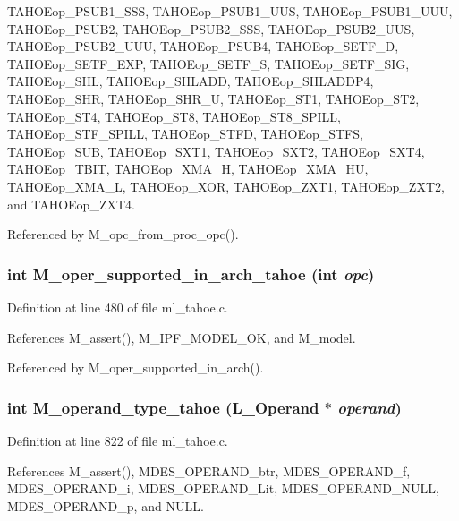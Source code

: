 TAHOEop\_\-PSUB1\_\-SSS, TAHOEop\_\-PSUB1\_\-UUS, TAHOEop\_\-PSUB1\_\-UUU, TAHOEop\_\-PSUB2, TAHOEop\_\-PSUB2\_\-SSS, TAHOEop\_\-PSUB2\_\-UUS, TAHOEop\_\-PSUB2\_\-UUU, TAHOEop\_\-PSUB4, TAHOEop\_\-SETF\_\-D, TAHOEop\_\-SETF\_\-EXP, TAHOEop\_\-SETF\_\-S, TAHOEop\_\-SETF\_\-SIG, TAHOEop\_\-SHL, TAHOEop\_\-SHLADD, TAHOEop\_\-SHLADDP4, TAHOEop\_\-SHR, TAHOEop\_\-SHR\_\-U, TAHOEop\_\-ST1, TAHOEop\_\-ST2, TAHOEop\_\-ST4, TAHOEop\_\-ST8, TAHOEop\_\-ST8\_\-SPILL, TAHOEop\_\-STF\_\-SPILL, TAHOEop\_\-STFD, TAHOEop\_\-STFS, TAHOEop\_\-SUB, TAHOEop\_\-SXT1, TAHOEop\_\-SXT2, TAHOEop\_\-SXT4, TAHOEop\_\-TBIT, TAHOEop\_\-XMA\_\-H, TAHOEop\_\-XMA\_\-HU, TAHOEop\_\-XMA\_\-L, TAHOEop\_\-XOR, TAHOEop\_\-ZXT1, TAHOEop\_\-ZXT2, and TAHOEop\_\-ZXT4.

Referenced by M\_\-opc\_\-from\_\-proc\_\-opc().
\subsubsection{\setlength{\rightskip}{0pt plus 5cm}int M\_\-oper\_\-supported\_\-in\_\-arch\_\-tahoe (int {\em opc})}\label{m__tahoe_8h_3dc904fa2e7528b127b4eb1cd19c004f}




Definition at line 480 of file ml\_\-tahoe.c.

References M\_\-assert(), M\_\-IPF\_\-MODEL\_\-OK, and M\_\-model.

Referenced by M\_\-oper\_\-supported\_\-in\_\-arch().
\subsubsection{\setlength{\rightskip}{0pt plus 5cm}int M\_\-operand\_\-type\_\-tahoe (L\_\-Operand $\ast$ {\em operand})}\label{m__tahoe_8h_e996d5f4bafca5d9e3a7f7e2abbdea57}




Definition at line 822 of file ml\_\-tahoe.c.

References M\_\-assert(), MDES\_\-OPERAND\_\-btr, MDES\_\-OPERAND\_\-f, MDES\_\-OPERAND\_\-i, MDES\_\-OPERAND\_\-Lit, MDES\_\-OPERAND\_\-NULL, MDES\_\-OPERAND\_\-p, and NULL.

